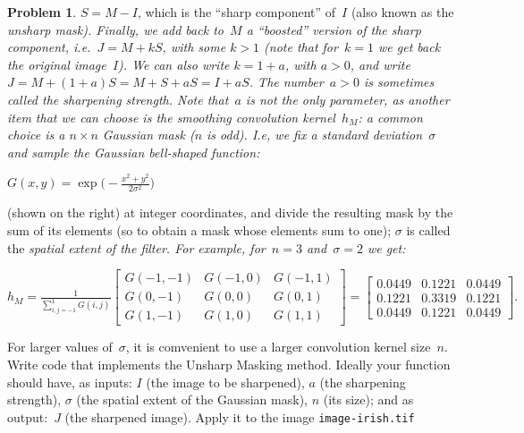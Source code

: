 \documentclass[11pt]{article}
\theoremstyle{plain}
\theoremstyle{definition}
\newtheorem{problem}{Problem}
\theoremstyle{remark}
\begin{document}
\begin{problem}
\begin{minipage}{13.25cm}
$S=M-I$, which is the ``sharp
component'' of~$I$ (also known as 
the \em unsharp mask\em\/).
Finally, we add back to~$M$
a ``boosted'' version of the sharp component,
i.e.~$J=M+kS$, with some $k>1$ 
(note that for~$k=1$ we get back the
original image~$I$). We can also write
$k=1+a$, with $a>0$, and write
$J=M+(1+a)S=M+S+aS=I+aS$.
The number~$a>0$ is sometimes called the 
\em sharpening strength\em\/.   
Note that~$a$ is not the only parameter,
as another item that we can choose is the
smoothing convolution kernel~$h_M$:
a common choice is  a $n\times n$ Gaussian mask 
($n$ is odd).
I.e, we fix a standard deviation~$\sigma$
and sample the Gaussian 
bell-shaped function:
\par\vspace{.15cm}
\hfill
$\displaystyle
G(x,y)=\exp\Big(-\frac{x^2+y^2}{2\sigma^2}\Big)$
\hfill\mbox{}\par\vspace{.15cm}
(shown on the right) at integer coordinates, 
and divide the resulting mask by
the sum of its elements (so to obtain 
a mask whose elements sum to one);
$\sigma$ is called the \em spatial extent \em of the filter.
For example,
for~$n=3$ and~$\sigma=2$ we get:
\end{minipage}
\par\vspace{.15cm}
\hfill
$\displaystyle
h_M
=\frac{1}{\sum_{i,j=-1}^1G(i,j)}
\left[
\begin{array}{ccc}
G(-1,-1) & G(-1,0) & G(-1,1)  \\
G(0,-1) & G(0,0) & G(0,1)  \\
G(1,-1) & G(1,0) & G(1,1)  
\end{array}
\right]
=
\left[
\begin{array}{ccc}
0.0449 & 0.1221 & 0.0449  \\
0.1221 & 0.3319 & 0.1221  \\
0.0449 & 0.1221 & 0.0449  
\end{array}
\right].
$
\hfill\mbox{}
\par
\par\vspace{.15cm}
For larger values of~$\sigma$, it is comvenient 
to use a larger convolution kernel size~$n$.
Write code that implements the Unsharp Masking 
method. Ideally your function should 
have, as inputs: $I$ (the image to be sharpened), 
$a$ (the sharpening strength), $\sigma$ (the spatial extent of the Gaussian mask), $n$
(its size); and as output:~$J$
(the sharpened image). Apply it to the image \verb+image-irish.tif+

\end{problem}
\end{document}
